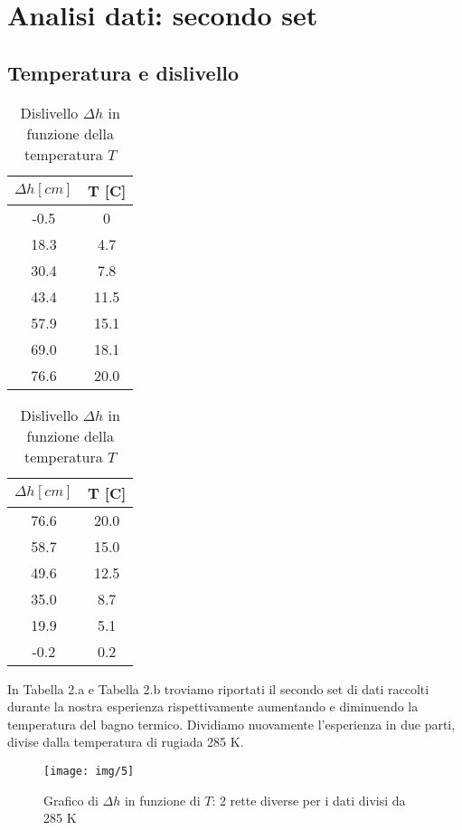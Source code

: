 \section{Analisi dati: secondo set}
\subsection{Temperatura e dislivello}

\begin{table}[H]
\centering

	\begin{subtable}{.5\textwidth}
		\centering
		\begin{tabular}{|c|c|} \hline
			\textbf{$\Delta h {[cm]}$ } & \textbf{T {[\degree C]} }  \\ \hline
			-0.5 & 0  \\ \hline
			18.3 & 4.7  \\ \hline
			30.4 & 7.8  \\ \hline
			43.4 & 11.5  \\ \hline
			57.9 & 15.1  \\ \hline
			69.0 & 18.1  \\ \hline
			76.6 & 20.0  \\ \hline
		\end{tabular}
		\caption{Aumento della temperatura }
	\end{subtable}%
	\begin{subtable}{.5\textwidth}
	\centering
	\begin{tabular}{|c|c|} \hline
		\textbf{$\Delta h {[cm]}$ } & \textbf{T {[\degree C]} }  \\ \hline
		76.6 & 20.0  \\ \hline
		58.7 & 15.0  \\ \hline
		49.6 & 12.5  \\ \hline
		35.0 & 8.7  \\ \hline
		19.9 & 5.1  \\ \hline
		-0.2 & 0.2  \\ \hline
	\end{tabular}
	\caption{Diminuzione della temperatura }
\end{subtable}

\caption{Dislivello $\Delta h$ in funzione della temperatura $T$ }
\end{table}
In Tabella 2.a e Tabella 2.b troviamo riportati il secondo set di dati raccolti durante la nostra esperienza rispettivamente aumentando e diminuendo la temperatura del bagno termico.
Dividiamo nuovamente l'esperienza in due parti, divise dalla temperatura di rugiada 285 K.
\begin{figure}[H]
\centering
\texttt{[image: img/5]}
\caption{Grafico di $\Delta h$ in funzione di $T$: 2 rette diverse per i dati divisi da 285 K}
\end{figure}

